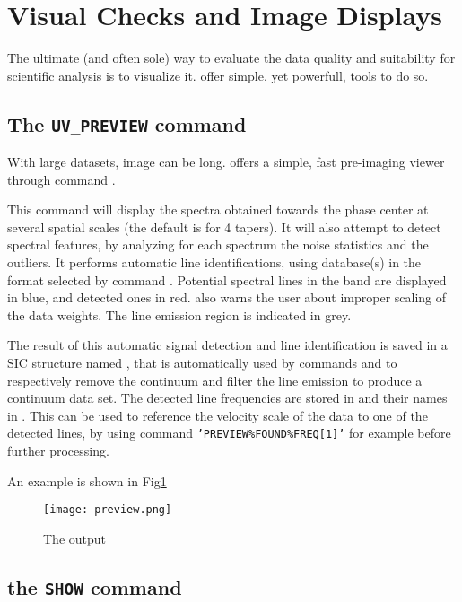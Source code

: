 \section{Visual Checks and Image Displays}

The ultimate (and often sole) way to evaluate the data quality
and suitability for scientific analysis is to visualize it.
\imager{} offer simple, yet powerfull, tools to do so.

\subsection{The \texttt{UV\_PREVIEW} command}
With large datasets, image can be long. \imager{} offers a
simple, fast pre-imaging viewer through command .

This command will display the spectra obtained towards the
phase center at several spatial scales (the default is for 4 tapers).
It will also attempt to detect spectral features, by analyzing for
each spectrum the noise statistics and the outliers. It performs
automatic line identifications, using database(s) in the 
format selected by command .
Potential spectral lines in the band are displayed in blue, and
detected ones in red.
 also warns the user about improper scaling
of the data weights.
The line emission region is indicated in grey.

The result of this automatic signal detection and line identification
is saved in a SIC structure named , that is 
automatically used by commands  and
 to respectively remove the continuum and
filter the line emission to produce a continuum data set. 
The detected line frequencies are stored in
  and their names in
. This can be used to reference
the velocity scale of the data to one of the detected lines, by
using command \texttt{'PREVIEW\%FOUND\%FREQ[1]'} 
for example before further processing.

An example is shown in Fig\ref{fig:preview}
\begin{figure}[!h]
  \centering
  \texttt{[image: preview.png]}
  \caption{The  output
\label{fig:preview}}
\end{figure}


\subsection{the \texttt{SHOW} command}

